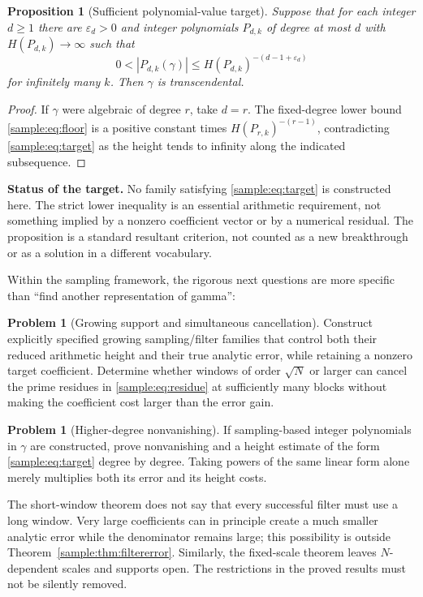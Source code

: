 \documentclass[11pt,a4paper]{article}
\newtheorem{proposition}[theorem]{Proposition}
\theoremstyle{definition}
\newtheorem{problem}[theorem]{Problem}
\theoremstyle{remark}
\numberwithin{equation}{section}
\begin{document}
\begin{proposition}[Sufficient polynomial-value target]\label{sample:prop:criterion}
Suppose that for each integer $d\ge1$ there are $\varepsilon_d>0$ and
integer polynomials $P_{d,k}$ of degree at most $d$ with
$H(P_{d,k})\to\infty$ such that
\begin{equation}\label{sample:eq:target}
0<|P_{d,k}(\gamma)|
\le H(P_{d,k})^{-(d-1+\varepsilon_d)}
\end{equation}
for infinitely many $k$. Then $\gamma$ is transcendental.
\end{proposition}
\begin{proof}
If $\gamma$ were algebraic of degree $r$, take $d=r$. The fixed-degree
lower bound \eqref{sample:eq:floor} is a positive constant times
$H(P_{r,k})^{-(r-1)}$, contradicting \eqref{sample:eq:target} as the height
tends to infinity along the indicated subsequence.
\end{proof}

\noindent\textbf{Status of the target.}
No family satisfying \eqref{sample:eq:target} is constructed here.
The strict lower inequality is an essential arithmetic requirement,
not something implied by a nonzero coefficient vector or by a numerical
residual. The proposition is a standard resultant criterion, not counted
as a new breakthrough or as a solution in a different vocabulary.

Within the sampling framework, the rigorous next questions are more
specific than ``find another representation of gamma'':
\begin{problem}[Growing support and simultaneous cancellation]
Construct explicitly specified growing sampling/filter families that
control both their reduced arithmetic height and their true analytic
error, while retaining a nonzero target coefficient. Determine whether
windows of order $\sqrt N$ or larger can cancel the prime residues in
\eqref{sample:eq:residue} at sufficiently many blocks without making the
coefficient cost larger than the error gain.
\end{problem}
\begin{problem}[Higher-degree nonvanishing]
If sampling-based integer polynomials in $\gamma$ are constructed,
prove nonvanishing and a height estimate of the form
\eqref{sample:eq:target} degree by degree. Taking powers of the same linear
form alone merely multiplies both its error and its height costs.
\end{problem}

The short-window theorem does not say that every successful filter must
use a long window. Very large coefficients can in principle create a
much smaller analytic error while the denominator remains large; this
possibility is outside Theorem~\ref{sample:thm:filtererror}. Similarly,
the fixed-scale theorem leaves $N$-dependent scales and supports open.
The restrictions in the proved results must not be silently removed.
\end{document}
